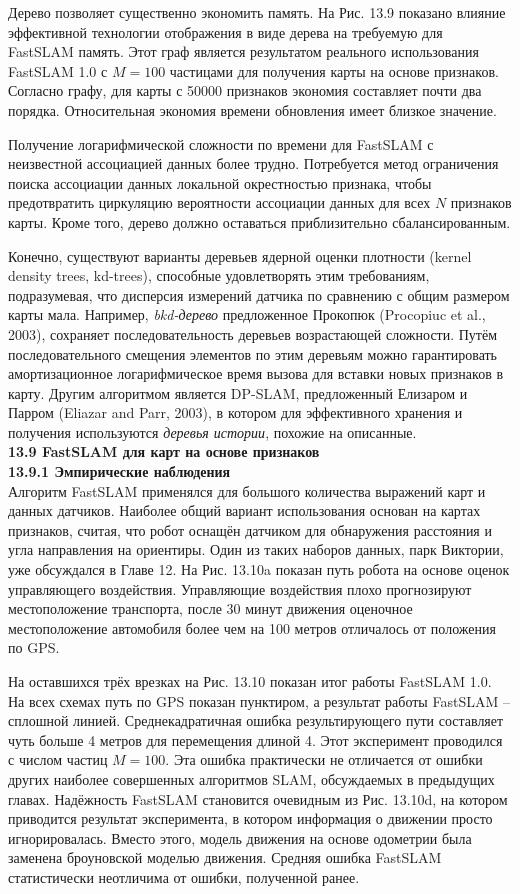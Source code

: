 \documentclass[10pt,a4paper]{article}
\begin{document}
Дерево позволяет существенно экономить память. На Рис. 13.9 показано влияние эффективной технологии отображения в виде дерева на требуемую для FastSLAM память. Этот граф является результатом реального использования FastSLAM 1.0 с $M=100$ частицами для получения карты на основе признаков. Согласно графу, для карты с 50000 признаков экономия составляет почти два порядка. Относительная экономия времени обновления имеет близкое значение.

Получение логарифмической сложности по времени для FastSLAM с неизвестной ассоциацией данных более трудно. Потребуется метод ограничения поиска ассоциации данных локальной окрестностью признака, чтобы предотвратить циркуляцию вероятности ассоциации данных для всех $N$ признаков карты. Кроме того, дерево должно оставаться приблизительно сбалансированным.

Конечно, существуют варианты деревьев ядерной оценки плотности (kernel density trees, kd-trees), способные удовлетворять этим требованиям, подразумевая, что дисперсия измерений датчика по сравнению с общим размером карты мала. Например, \textit{bkd-дерево} предложенное Прокопюк (Procopiuc et al., 2003), сохраняет последовательность деревьев возрастающей сложности. Путём последовательного смещения элементов по этим деревьям можно гарантировать амортизационное логарифмическое время вызова для вставки новых признаков в карту. Другим алгоритмом является DP-SLAM, предложенный Елизаром и Парром (Eliazar and Parr, 2003), в котором для эффективного хранения и получения используются \textit{деревья истории}, похожие на описанные.\\

\textbf{13.9	FastSLAM для карт на основе признаков}\\

\textbf{13.9.1	Эмпирические наблюдения}\\

Алгоритм FastSLAM применялся для большого количества выражений карт и данных датчиков. Наиболее общий вариант использования основан на картах признаков, считая, что робот оснащён датчиком для обнаружения расстояния и угла направления на ориентиры. Один из таких наборов данных, парк Виктории, уже обсуждался в Главе 12. На Рис. 13.10a показан путь робота на основе оценок управляющего воздействия.  Управляющие воздействия плохо прогнозируют местоположение транспорта, после 30 минут движения оценочное местоположение автомобиля более чем на 100 метров отличалось от положения по GPS.

На оставшихся трёх врезках на Рис. 13.10 показан итог работы FastSLAM 1.0. На всех схемах путь по GPS показан пунктиром, а результат работы FastSLAM – сплошной линией. Среднекадратичная ошибка результирующего пути составляет чуть больше 4 метров для перемещения длиной 4. Этот эксперимент проводился с числом частиц $M=100$. Эта ошибка практически не отличается от ошибки других наиболее совершенных алгоритмов SLAM, обсуждаемых в предыдущих главах. Надёжность FastSLAM становится очевидным из Рис. 13.10d, на котором приводится результат эксперимента, в котором информация о движении просто игнорировалась. Вместо этого, модель движения на основе одометрии была заменена броуновской моделью движения. Средняя ошибка FastSLAM статистически неотличима от ошибки, полученной ранее.
\end{document}

